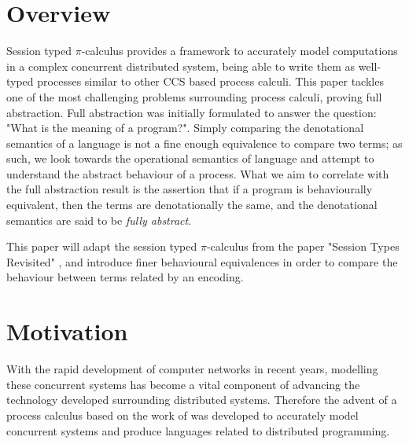 
\section{Overview}
Session typed $\pi$-calculus provides a framework to accurately model computations in a complex concurrent distributed system, being able to write them as well-typed processes similar to other CCS based process calculi. This paper tackles one of the most challenging problems surrounding process calculi, proving full abstraction. Full abstraction was initially formulated to answer the question: "What is the meaning of a program?". Simply comparing the denotational semantics of a language is not a fine enough equivalence to compare two terms; as such, we look towards the operational semantics of language and attempt to understand the abstract behaviour of a process. What we aim to correlate with the full abstraction result is the assertion that if a program is behaviourally equivalent, then the terms are denotationally the same, and the denotational semantics are said to be \textit{fully abstract}.

This paper will adapt the session typed $\pi$-calculus from the paper "Session Types Revisited" \cite{dardha2017session}, and introduce finer behavioural equivalences in order to compare the behaviour between terms related by an encoding.





\section{Motivation}
With the rapid development of computer networks in recent years, modelling these concurrent systems has become a vital component of advancing the technology developed surrounding distributed systems. Therefore the advent of a process calculus based on the work of \cite{milner1980calculus} was developed to accurately model concurrent systems and produce languages related to distributed programming.

